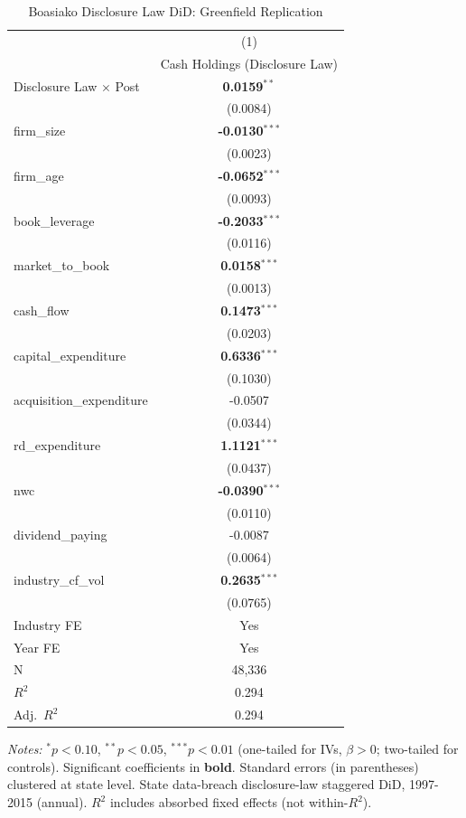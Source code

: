 \begin{landscape}
\begin{table}[H]
\setlength{\tabcolsep}{3pt}
\renewcommand{\arraystretch}{0.85}
\centering
\caption{Boasiako Disclosure Law DiD: Greenfield Replication}
\label{tab:h1_5_disclosure_law_did}
\scriptsize
\begin{tabular}{lc}
\toprule
 & (1) \\
 & Cash Holdings (Disclosure Law) \\
\midrule
Disclosure Law $\times$ Post & \textbf{0.0159}$^{**}$ \\
 & (0.0084) \\
\midrule
firm\_size & \textbf{-0.0130}$^{***}$ \\
 & (0.0023) \\
firm\_age & \textbf{-0.0652}$^{***}$ \\
 & (0.0093) \\
book\_leverage & \textbf{-0.2033}$^{***}$ \\
 & (0.0116) \\
market\_to\_book & \textbf{0.0158}$^{***}$ \\
 & (0.0013) \\
cash\_flow & \textbf{0.1473}$^{***}$ \\
 & (0.0203) \\
capital\_expenditure & \textbf{0.6336}$^{***}$ \\
 & (0.1030) \\
acquisition\_expenditure & -0.0507 \\
 & (0.0344) \\
rd\_expenditure & \textbf{1.1121}$^{***}$ \\
 & (0.0437) \\
nwc & \textbf{-0.0390}$^{***}$ \\
 & (0.0110) \\
dividend\_paying & -0.0087 \\
 & (0.0064) \\
industry\_cf\_vol & \textbf{0.2635}$^{***}$ \\
 & (0.0765) \\
\midrule
Industry FE & Yes \\
Year FE & Yes \\
\midrule
N & 48,336 \\
$R^2$ & 0.294 \\
Adj.~$R^2$ & 0.294 \\
\bottomrule
\end{tabular}
\begin{minipage}{\linewidth}
\vspace{2pt}\scriptsize
\textit{Notes:} $^{*}p<0.10$, $^{**}p<0.05$, $^{***}p<0.01$ (one-tailed for IVs, $\beta > 0$; two-tailed for controls).
 Significant coefficients in \textbf{bold}.
 Standard errors (in parentheses) clustered at state level.
 State data-breach disclosure-law staggered DiD, 1997-2015 (annual).
 $R^2$ includes absorbed fixed effects (not within-$R^2$).
\end{minipage}
\end{table}
\end{landscape}